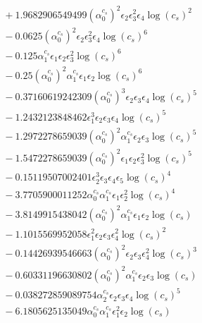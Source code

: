 \documentclass[10pt]{article}
\begin{document}
\begin{align*}
&{}  + 1.9682906549499 \left(\alpha_{0}^{c_s}\right)^{2} \epsilon_{2} \epsilon_{3}^{2} \epsilon_{4} \log{\left(c_{s} \right)}^{2} \\
&{}  - 0.0625 \left(\alpha_{0}^{c_s}\right)^{2} \epsilon_{2} \epsilon_{3}^{2} \epsilon_{4} \log{\left(c_{s} \right)}^{6} \\
&{}  - 0.125 \alpha_{1}^{c_s} \epsilon_{1} \epsilon_{2} \epsilon_{3}^{2} \log{\left(c_{s} \right)}^{6} \\
&{}  - 0.25 \left(\alpha_{0}^{c_s}\right)^{2} \alpha_{1}^{c_s} \epsilon_{1} \epsilon_{2} \log{\left(c_{s} \right)}^{6} \\
&{}  - 0.37160619242309 \left(\alpha_{0}^{c_s}\right)^{3} \epsilon_{2} \epsilon_{3} \epsilon_{4} \log{\left(c_{s} \right)}^{5} \\
&{}  - 1.2432123848462 \epsilon_{1}^{3} \epsilon_{2} \epsilon_{3} \epsilon_{4} \log{\left(c_{s} \right)}^{5} \\
&{}  - 1.2972278659039 \left(\alpha_{0}^{c_s}\right)^{2} \alpha_{1}^{c_s} \epsilon_{2} \epsilon_{3} \log{\left(c_{s} \right)}^{5} \\
&{}  - 1.5472278659039 \left(\alpha_{0}^{c_s}\right)^{2} \epsilon_{1} \epsilon_{2} \epsilon_{3}^{2} \log{\left(c_{s} \right)}^{5} \\
&{}  - 0.15119507002401 \epsilon_{2}^{3} \epsilon_{3} \epsilon_{4} \epsilon_{5} \log{\left(c_{s} \right)}^{4} \\
&{}  - 3.7705900011252 \alpha_{0}^{c_s} \alpha_{1}^{c_s} \epsilon_{1} \epsilon_{2}^{2} \log{\left(c_{s} \right)}^{4} \\
&{}  - 3.8149915438042 \left(\alpha_{0}^{c_s}\right)^{2} \alpha_{1}^{c_s} \epsilon_{1} \epsilon_{2} \log{\left(c_{s} \right)} \\
&{}  - 1.1015569952058 \epsilon_{1}^{2} \epsilon_{2} \epsilon_{3} \epsilon_{4}^{2} \log{\left(c_{s} \right)}^{2} \\
&{}  - 0.14426939546663 \left(\alpha_{0}^{c_s}\right)^{2} \epsilon_{2} \epsilon_{3} \epsilon_{4}^{2} \log{\left(c_{s} \right)}^{3} \\
&{}  - 0.60331196630802 \left(\alpha_{0}^{c_s}\right)^{2} \alpha_{1}^{c_s} \epsilon_{2} \epsilon_{3} \log{\left(c_{s} \right)} \\
&{}  - 0.038272859089754 \alpha_{2}^{c_s} \epsilon_{2} \epsilon_{3} \epsilon_{4} \log{\left(c_{s} \right)}^{5} \\
&{}  - 6.1805625135049 \alpha_{0}^{c_s} \alpha_{1}^{c_s} \epsilon_{1}^{2} \epsilon_{2} \log{\left(c_{s} \right)} \\

\end{align*}
\end{document}
